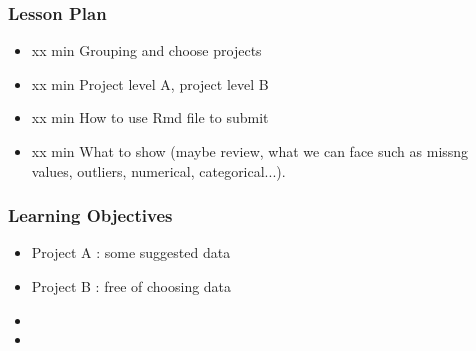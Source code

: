 

\begin{frame}
\frametitle{Lesson Plan}
\begin{itemize}
    \item xx min Grouping and choose projects 
    \item xx min Project level A, project level B
    \item xx min How to use Rmd file to submit 
    \item xx min What to show (maybe review, what we can face such as missng values, outliers, numerical, categorical...).
\end{itemize}
\end{frame}


\begin{frame}
\frametitle{Learning Objectives}

\begin{itemize}
    \item Project A : some suggested data
    \item Project B : free of choosing data
    \item 
    \item 
\end{itemize}
\end{frame}

